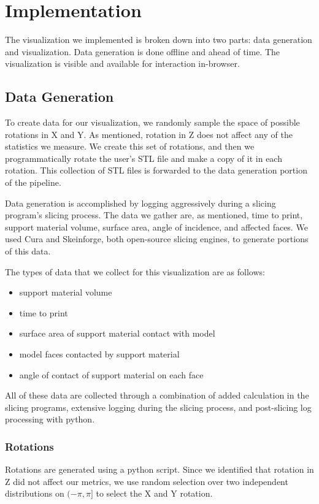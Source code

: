\documentclass{sigchi}
\begin{document}
\section{Implementation}
The visualization we implemented is broken down into two parts: data generation and visualization.  Data generation is done offline and ahead of time.  The visualization is visible and available for interaction in-browser.

\subsection{Data Generation}
To create data for our visualization, we randomly sample the space of possible rotations in X and Y.  As mentioned, rotation in Z does not affect any of the statistics we measure.  We create this set of rotations, and then we programmatically rotate the user's STL file and make a copy of it in each rotation.  This collection of STL files is forwarded to the data generation portion of the pipeline.

Data generation is accomplished by logging aggressively during a slicing program's slicing process.  The data we gather are, as mentioned, time to print, support material volume, surface area, angle of incidence, and affected faces.  We used Cura and Skeinforge, both open-source slicing engines, to generate portions of this data.

The types of data that we collect for this visualization are as follows:
\begin{itemize}
\item support material volume
\item time to print
\item surface area of support material contact with model
\item model faces contacted by support material
\item angle of contact of support material on each face
\end{itemize}

All of these data are collected through a combination of added calculation in the slicing programs, extensive logging during the slicing process, and post-slicing log processing with python.

\subsubsection{Rotations}
Rotations are generated using a python script.  Since we identified that rotation in Z did not affect our metrics, we use random selection over two independent distributions on $(-\pi,\pi]$ to select the X and Y rotation.
\end{document}
